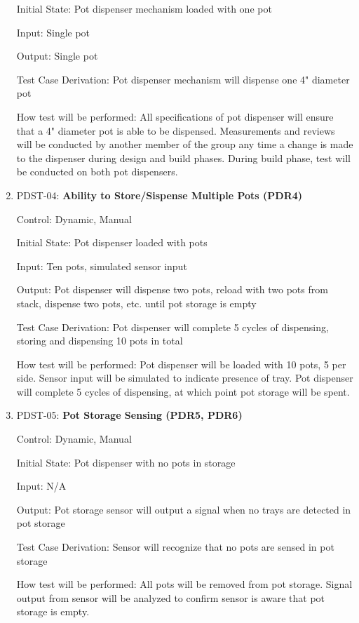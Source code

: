 \documentclass[12pt, titlepage]{article}
\begin{document}
\begin{enumerate}
  Initial State: Pot dispenser mechanism loaded with one pot

  Input: Single pot

  Output: Single pot

  Test Case Derivation: Pot dispenser mechanism will dispense one 4" diameter pot

  How test will be performed: All specifications of pot dispenser will ensure that a 4" diameter pot is able 
  to be dispensed. Measurements and reviews will be conducted by another member of the group any time a change 
  is made to the dispenser during design and build phases. During build phase, test will be conducted on both 
  pot dispensers.\\

  \item{PDST-04: \textbf{Ability to Store/Sispense Multiple Pots (PDR4)}}
  
  Control: Dynamic, Manual

  Initial State: Pot dispenser loaded with pots

  Input: Ten pots, simulated sensor input

  Output: Pot dispenser will dispense two pots, reload with two pots from stack, dispense two pots, etc. until
  pot storage is empty

  Test Case Derivation: Pot dispenser will complete 5 cycles of dispensing, storing and dispensing 10 pots in total

  How test will be performed: Pot dispenser will be loaded with 10 pots, 5 per side. Sensor input will be simulated
  to indicate presence of tray. Pot dispenser will complete 5 cycles of dispensing, at which point pot storage will
  be spent.\\
  
  \item{PDST-05: \textbf{Pot Storage Sensing (PDR5, PDR6)}}
  
  Control: Dynamic, Manual

  Initial State: Pot dispenser with no pots in storage

  Input: N/A

  Output: Pot storage sensor will output a signal when no trays are detected in pot storage

  Test Case Derivation: Sensor will recognize that no pots are sensed in pot storage

  How test will be performed: All pots will be removed from pot storage. Signal output from sensor will be
  analyzed to confirm sensor is aware that pot storage is empty.\\

\end{enumerate}
\end{document}
